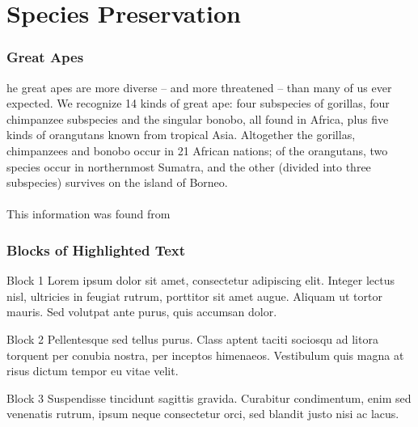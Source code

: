 \documentclass[12pt]{beamer}\usepackage[]{graphicx}\usepackage[]{color}
\begin{document}
\section{Species Preservation}
\begin{frame}
\frametitle{Great Apes}
he great apes are more diverse – and more threatened – than many of us ever expected. We recognize 14 kinds of great ape: four subspecies of gorillas, four chimpanzee subspecies and the singular bonobo, all found in Africa, plus five kinds of orangutans known from tropical Asia. Altogether the gorillas, chimpanzees and bonobo occur in 21 African nations; of the orangutans, two species occur in northernmost Sumatra, and the other (divided into three subspecies) survives on the island of Borneo.\\~\\

This information was found from 
\end{frame}

\begin{frame}
\frametitle{Blocks of Highlighted Text}
\begin{block}{Block 1}
Lorem ipsum dolor sit amet, consectetur adipiscing elit. Integer lectus nisl, ultricies in feugiat rutrum, porttitor sit amet augue. Aliquam ut tortor mauris. Sed volutpat ante purus, quis accumsan dolor.
\end{block}

\begin{block}{Block 2}
Pellentesque sed tellus purus. Class aptent taciti sociosqu ad litora torquent per conubia nostra, per inceptos himenaeos. Vestibulum quis magna at risus dictum tempor eu vitae velit.
\end{block}

\begin{block}{Block 3}
Suspendisse tincidunt sagittis gravida. Curabitur condimentum, enim sed venenatis rutrum, ipsum neque consectetur orci, sed blandit justo nisi ac lacus.
\end{block}
\end{frame}
\end{document}
